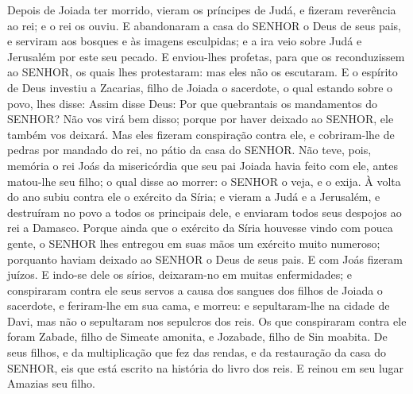 {Depois de Joiada ter morrido, vieram os príncipes de Judá, e fizeram reverência ao rei; e o rei os ouviu.
E abandonaram a casa do SENHOR o Deus de seus pais, e serviram aos bosques e às imagens esculpidas; e a ira veio sobre Judá e Jerusalém por este seu pecado.
E enviou-lhes profetas, para que os reconduzissem ao SENHOR, os quais lhes protestaram: mas eles não os escutaram.
E o espírito de Deus investiu a Zacarias, filho de Joiada o sacerdote, o qual estando sobre o povo, lhes disse: Assim disse Deus: Por que quebrantais os mandamentos do SENHOR? Não vos virá bem disso; porque por haver deixado ao SENHOR, ele também vos deixará.
Mas eles fizeram conspiração contra ele, e cobriram-lhe de pedras por mandado do rei, no pátio da casa do SENHOR.
Não teve, pois, memória o rei Joás da misericórdia que seu pai Joiada havia feito com ele, antes matou-lhe seu filho; o qual disse ao morrer: o SENHOR o veja, e o exija.
À volta do ano subiu contra ele o exército da Síria; e vieram a Judá e a Jerusalém, e destruíram no povo a todos os principais dele, e enviaram todos seus despojos ao rei a Damasco.
Porque ainda que o exército da Síria houvesse vindo com pouca gente, o SENHOR lhes entregou em suas mãos um exército muito numeroso; porquanto haviam deixado ao SENHOR o Deus de seus pais. E com Joás fizeram juízos.
E indo-se dele os sírios, deixaram-no em muitas enfermidades; e conspiraram contra ele seus servos a causa dos sangues dos filhos de Joiada o sacerdote, e feriram-lhe em sua cama, e morreu: e sepultaram-lhe na cidade de Davi, mas não o sepultaram nos sepulcros dos reis.
Os que conspiraram contra ele foram Zabade, filho de Simeate amonita, e Jozabade, filho de Sin moabita.
De seus filhos, e da multiplicação que fez das rendas, e da restauração da casa do SENHOR, eis que está escrito na história do livro dos reis. E reinou em seu lugar Amazias seu filho.

}
